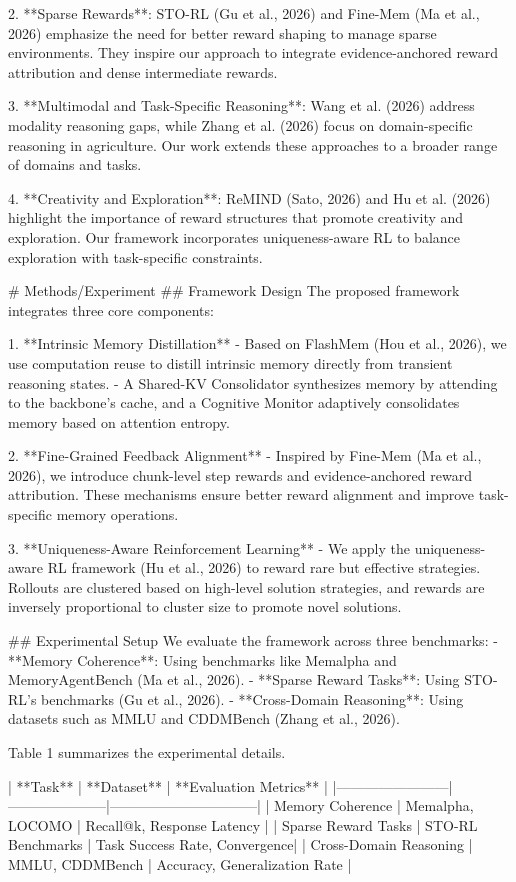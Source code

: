 2. **Sparse Rewards**: STO-RL (Gu et al., 2026) and Fine-Mem (Ma et al., 2026) emphasize the need for better reward shaping to manage sparse environments. They inspire our approach to integrate evidence-anchored reward attribution and dense intermediate rewards.

3. **Multimodal and Task-Specific Reasoning**: Wang et al. (2026) address modality reasoning gaps, while Zhang et al. (2026) focus on domain-specific reasoning in agriculture. Our work extends these approaches to a broader range of domains and tasks.

4. **Creativity and Exploration**: ReMIND (Sato, 2026) and Hu et al. (2026) highlight the importance of reward structures that promote creativity and exploration. Our framework incorporates uniqueness-aware RL to balance exploration with task-specific constraints.

# Methods/Experiment  
## Framework Design  
The proposed framework integrates three core components:  

1. **Intrinsic Memory Distillation**  
   - Based on FlashMem (Hou et al., 2026), we use computation reuse to distill intrinsic memory directly from transient reasoning states.  
   - A Shared-KV Consolidator synthesizes memory by attending to the backbone's cache, and a Cognitive Monitor adaptively consolidates memory based on attention entropy.  

2. **Fine-Grained Feedback Alignment**  
   - Inspired by Fine-Mem (Ma et al., 2026), we introduce chunk-level step rewards and evidence-anchored reward attribution. These mechanisms ensure better reward alignment and improve task-specific memory operations.  

3. **Uniqueness-Aware Reinforcement Learning**  
   - We apply the uniqueness-aware RL framework (Hu et al., 2026) to reward rare but effective strategies. Rollouts are clustered based on high-level solution strategies, and rewards are inversely proportional to cluster size to promote novel solutions.

## Experimental Setup  
We evaluate the framework across three benchmarks:  
- **Memory Coherence**: Using benchmarks like Memalpha and MemoryAgentBench (Ma et al., 2026).  
- **Sparse Reward Tasks**: Using STO-RL's benchmarks (Gu et al., 2026).  
- **Cross-Domain Reasoning**: Using datasets such as MMLU and CDDMBench (Zhang et al., 2026).  

Table 1 summarizes the experimental details.  

| **Task**              | **Dataset**         | **Evaluation Metrics**        |  
|------------------------|---------------------|--------------------------------|  
| Memory Coherence       | Memalpha, LOCOMO   | Recall@k, Response Latency    |  
| Sparse Reward Tasks    | STO-RL Benchmarks  | Task Success Rate, Convergence|  
| Cross-Domain Reasoning | MMLU, CDDMBench    | Accuracy, Generalization Rate |  

